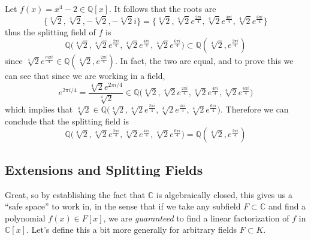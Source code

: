   \begin{example}
    Let $f(x) = x^4 - 2 \in \mathbb{Q}[x]$. It follows that the roots are 
    \begin{equation}
      \{ \sqrt[4]{2}, \sqrt[4]{2}, -\sqrt[4]{2}, - \sqrt[4]{2} i \} = \Big\{ \sqrt[4]{2}, \sqrt[4]{2} e^{\frac{2\pi i}{4}}, \sqrt[4]{2} e^{\frac{4\pi i}{4}}, \sqrt[4]{2} e^{\frac{6\pi i}{4}} \Big\}
    \end{equation}
    thus the splitting field of $f$ is 
    \begin{equation}
      \mathbb{Q} \big( \sqrt[4]{2}, \sqrt[4]{2} e^{\frac{2\pi i}{4}}, \sqrt[4]{2} e^{\frac{4\pi i}{4}}, \sqrt[4]{2} e^{\frac{6\pi i}{4}} \big) \subset \mathbb{Q}(\sqrt[4]{2}, e^{\frac{2\pi i}{4}})
    \end{equation}
    since $\sqrt[4]{2} e^{\frac{m \pi i}{4}} \in \mathbb{Q}(\sqrt[4]{2}, e^{\frac{2\pi i}{4}})$. In fact, the two are equal, and to prove this we can see that since we are working in a field, 
    \begin{equation}
      e^{2 \pi i / 4} = \frac{\sqrt[4]{2} e^{2\pi i/4}}{\sqrt[4]{2}} \in \mathbb{Q} \big( \sqrt[4]{2}, \sqrt[4]{2} e^{\frac{2\pi i}{4}}, \sqrt[4]{2} e^{\frac{4\pi i}{4}}, \sqrt[4]{2} e^{\frac{6\pi i}{4}} \big) 
    \end{equation}
    which implies that $\sqrt[4]{2} \in \mathbb{Q} \big( \sqrt[4]{2}, \sqrt[4]{2} e^{\frac{2\pi i}{4}}, \sqrt[4]{2} e^{\frac{4\pi i}{4}}, \sqrt[4]{2} e^{\frac{6\pi i}{4}} \big)$. Therefore we can conclude that the splitting field is 
    \begin{equation}
      \mathbb{Q} \big( \sqrt[4]{2}, \sqrt[4]{2} e^{\frac{2\pi i}{4}}, \sqrt[4]{2} e^{\frac{4\pi i}{4}}, \sqrt[4]{2} e^{\frac{6\pi i}{4}} \big) = \mathbb{Q}(\sqrt[4]{2}, e^{\frac{2\pi i}{4}})
    \end{equation}
  \end{example} 

\subsection{Extensions and Splitting Fields} 

  Great, so by establishing the fact that $\mathbb{C}$ is algebraically closed, this gives us a ``safe space'' to work in, in the sense that if we take any subfield $F \subset \mathbb{C}$ and find a polynomial $f(x) \in F[x]$, we are \textit{guaranteed} to find a linear factorization of $f$ in $\mathbb{C}[x]$. Let's define this a bit more generally for arbitrary fields $F \subset K$. 

